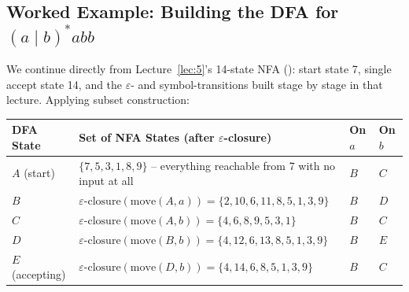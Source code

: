 \documentclass[full-course-notes.tex]{subfiles}
\begin{document}
\subsection{Worked Example: Building the DFA for $(a\mid b)^{*}abb$}
\label{sec:l6-subset-worked}

\dbtag We continue directly from Lecture~\ref{lec:5}'s 14-state NFA
(): start state 7, single accept state 14, and the $\varepsilon$-
and symbol-transitions built stage by stage in that lecture. Applying subset construction:

\begin{center}
\renewcommand{\arraystretch}{1.3}
\small
\begin{tabularx}{\textwidth}{@{}l X l l@{}}
\toprule
\textbf{DFA State} & \textbf{Set of NFA States (after $\varepsilon$-closure)} & \textbf{On $a$}
& \textbf{On $b$} \\
\midrule
$A$ (start) & $\{7, 5, 3, 1, 8, 9\}$ -- everything reachable from 7 with no input at all & $B$ &
$C$ \\
$B$ & $\varepsilon\text{-closure}(\text{move}(A,a)) = \{2, 10, 6, 11, 8, 5, 1, 3, 9\}$ & $B$ & $D$ \\
$C$ & $\varepsilon\text{-closure}(\text{move}(A,b)) = \{4, 6, 8, 9, 5, 3, 1\}$ & $B$ & $C$ \\
$D$ & $\varepsilon\text{-closure}(\text{move}(B,b)) = \{4, 12, 6, 13, 8, 5, 1, 3, 9\}$ & $B$ & $E$ \\
$E$ (accepting) & $\varepsilon\text{-closure}(\text{move}(D,b)) = \{4, 14, 6, 8, 5, 1, 3, 9\}$ & $B$
& $C$ \\
\bottomrule
\end{tabularx}
\end{center}
\end{document}
